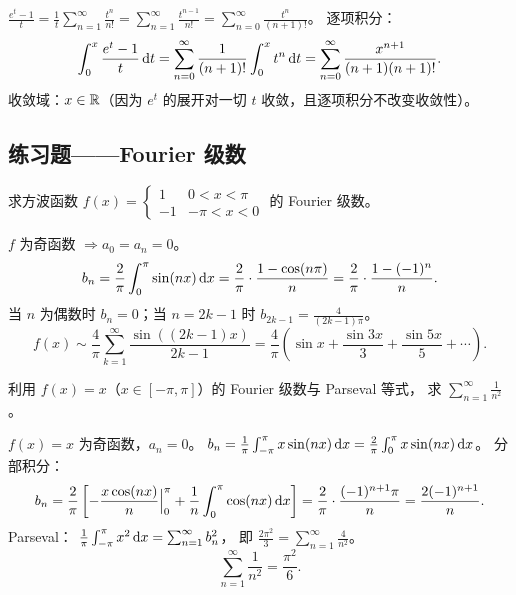 \documentclass{ctexart}
\begin{document}
\begin{solution}
  $\frac{e^t - 1}{t} = \frac{1}{t}\sum_{n=1}^\infty \frac{t^n}{n!}
  = \sum_{n=1}^\infty \frac{t^{n-1}}{n!}
  = \sum_{n=0}^\infty \frac{t^n}{(n+1)!}$。
  逐项积分：
  \[
    \int_0^x \frac{e^t - 1}{t}\,\mathrm{d} t
    = \sum_{n=0}^\infty \frac{1}{(n+1)!}\int_0^x t^n \,\mathrm{d} t
    = \sum_{n=0}^\infty \frac{x^{n+1}}{(n+1)(n+1)!}.
  \]
  收敛域：$x \in \mathbb{R}$（因为 $e^t$ 的展开对一切 $t$ 收敛，且逐项积分不改变收敛性）。
\end{solution}

\subsection{练习题——Fourier 级数}

\begin{exercise}[基本 Fourier 系数——方波]
  求方波函数
  $f(x) = \begin{cases} 1 & 0 < x < \pi \\ -1 & -\pi < x < 0 \end{cases}$
  的 Fourier 级数。
\end{exercise}

\begin{solution}
  $f$ 为奇函数 $\Rightarrow a_0 = a_n = 0$。
  \[
    b_n = \frac{2}{\pi}\int_0^\pi \sin(nx) \,\mathrm{d} x
    = \frac{2}{\pi}\cdot\frac{1-\cos(n\pi)}{n}
    = \frac{2}{\pi}\cdot\frac{1-(-1)^n}{n}.
  \]
  当 $n$ 为偶数时 $b_n = 0$；当 $n = 2k-1$ 时 $b_{2k-1} = \frac{4}{(2k-1)\pi}$。
  \[
    f(x) \sim \frac{4}{\pi}\sum_{k=1}^\infty \frac{\sin((2k-1)x)}{2k-1}
    = \frac{4}{\pi}\left( \sin x + \frac{\sin 3x}{3} + \frac{\sin 5x}{5} + \cdots \right).
  \]
\end{solution}

\begin{exercise}
  利用 $f(x) = x$（$x \in [-\pi,\pi]$）的 Fourier 级数与 Parseval 等式，
  求 $\sum_{n=1}^\infty \frac{1}{n^2}$。
\end{exercise}

\begin{solution}
  $f(x)=x$ 为奇函数，$a_n = 0$。
  $b_n = \frac{1}{\pi}\int_{-\pi}^\pi x\sin(nx) \,\mathrm{d} x
  = \frac{2}{\pi}\int_0^\pi x\sin(nx) \,\mathrm{d} x$。
  分部积分：
  \[
    b_n = \frac{2}{\pi}\left[ -\frac{x\cos(nx)}{n}\Big|_0^\pi + \frac{1}{n}\int_0^\pi\cos(nx)\,\mathrm{d} x \right]
    = \frac{2}{\pi}\cdot\frac{(-1)^{n+1}\pi}{n}
    = \frac{2(-1)^{n+1}}{n}.
  \]
  Parseval：
  $\frac{1}{\pi}\int_{-\pi}^\pi x^2 \,\mathrm{d} x = \sum_{n=1}^\infty b_n^2$，
  即 $\frac{2\pi^2}{3} = \sum_{n=1}^\infty \frac{4}{n^2}$。
  \[
    \sum_{n=1}^\infty \frac{1}{n^2} = \frac{\pi^2}{6}.
  \]
\end{solution}
\end{document}
